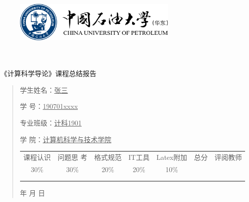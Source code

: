 \documentclass{article}
\renewcommand{\today}{\number\year 年 \number\month 月 \number\day 日}
\begin{document}
\begin{figure}
    \centering
    \includegraphics[width=8cm]{upc.png}

    \label{figupc}
\end{figure}

	\begin{center}
		\quad \\
		\quad \\
		\heiti \fontsize{45}{17} \quad \quad \quad 
		\vskip 1.5cm
		\heiti {} 《计算科学导论》课程总结报告
	\end{center}
	\vskip 2.0cm
		
	\begin{quotation}
		\doublespacing
		
        \par\setlength\parindent{7em}
		\quad 

		学生姓名：\underline{\qquad  张三 \qquad \qquad}

		学\hspace{0.61cm} 号：\underline{\qquad 190701xxxx\qquad}
		
		专业班级：\underline{\qquad 计科1901 \qquad  }
		
        学\hspace{0.61cm} 院：\underline{计算机科学与技术学院}
		\vskip 2cm
		\centering
		\begin{table}[h]
            \centering 
            \begin{tabular}{|c|c|c|c|c|c|c|}
                \hline
                课程认识 & 问题思 考 & 格式规范  & IT工具  & Latex附加  & 总分 & 评阅教师 \\
                30\% & 30\% & 20\% & 20\% & 10\% &  &  \\
                \hline
                 & & & & & &\\
                & & & & & &\\
                \hline
            \end{tabular}
        \end{table}
		\vskip 2cm
		\today
	\end{quotation}
\end{document}
